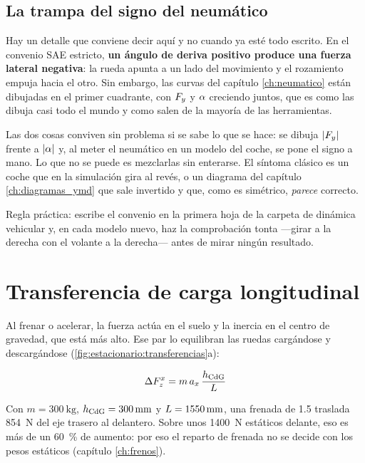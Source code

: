 \subsection{La trampa del signo del neumático}

Hay un detalle que conviene decir aquí y no cuando ya esté todo escrito. En el
convenio SAE estricto, \textbf{un ángulo de deriva positivo produce una fuerza
lateral negativa}: la rueda apunta a un lado del movimiento y el rozamiento
empuja hacia el otro. Sin embargo, las curvas del capítulo \ref{ch:neumatico}
están dibujadas en el primer cuadrante, con $F_y$ y $\alpha$ creciendo juntos,
que es como las dibuja casi todo el mundo y como salen de la mayoría de las
herramientas.

\begin{ojo}
Las dos cosas conviven sin problema si se sabe lo que se hace: se dibuja
$|F_y|$ frente a $|\alpha|$ y, al meter el neumático en un modelo del coche, se
pone el signo a mano. Lo que no se puede es mezclarlas sin enterarse. El
síntoma clásico es un coche que en la simulación gira al revés, o un diagrama
del capítulo \ref{ch:diagramas_ymd} que sale invertido y que, como es simétrico,
\emph{parece} correcto.

Regla práctica: escribe el convenio en la primera hoja de la carpeta de
dinámica vehicular y, en cada modelo nuevo, haz la comprobación tonta ---girar
a la derecha con el volante a la derecha--- antes de mirar ningún resultado.
\end{ojo}

\section{Transferencia de carga longitudinal}
\label{sec:regimen_estacionario:02}

Al frenar o acelerar, la fuerza actúa en el suelo y la inercia en el centro de
gravedad, que está más alto. Ese par lo equilibran las ruedas cargándose y
descargándose (\cref{fig:estacionario:transferencias}a):

\begin{equation}
  \Delta F_z^{x} = m\,a_x\,\frac{h_{\mathrm{CdG}}}{L}
  \label{eq:transferencia_long}
\end{equation}

Con $m = \SI{300}{\kilogram}$, $h_{\mathrm{CdG}} = \SI{300}{\milli\meter}$ y
$L = \SI{1550}{\milli\meter}$, una frenada de \SI{1.5}{\gacc} traslada
\SI{854}{\newton} del eje trasero al delantero. Sobre unos \SI{1400}{\newton}
estáticos delante, eso es más de un \SI{60}{\percent} de aumento: por eso el
reparto de frenada no se decide con los pesos estáticos (capítulo
\ref{ch:frenos}).

